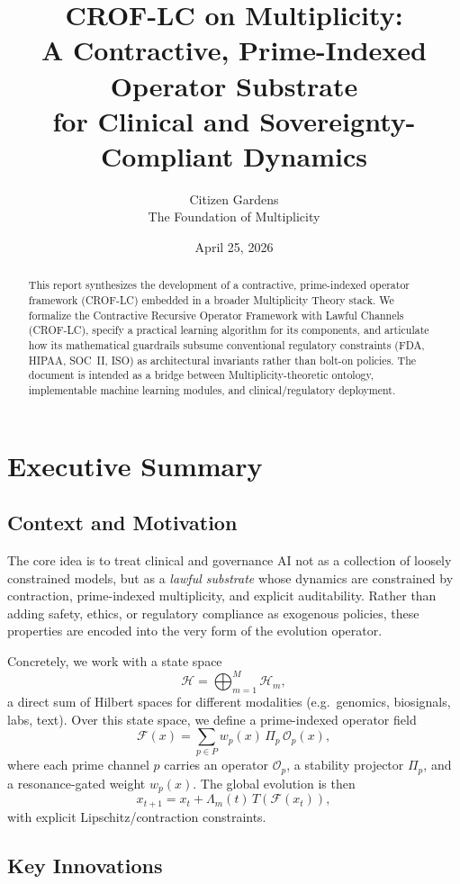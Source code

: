 \documentclass[11pt]{article}
\title{%
  CROF-LC on Multiplicity: \\
  A Contractive, Prime-Indexed Operator Substrate \\
  for Clinical and Sovereignty-Compliant Dynamics
}
\author{Citizen Gardens \\ The Foundation of Multiplicity}
\date{April 25, 2026}
\begin{document}
\maketitle

\begin{abstract}
This report synthesizes the development of a contractive, prime-indexed operator framework (CROF-LC) embedded in a broader Multiplicity Theory stack.
We formalize the Contractive Recursive Operator Framework with Lawful Channels (CROF-LC), specify a practical learning algorithm for its components, and articulate how its mathematical guardrails subsume conventional regulatory constraints (FDA, HIPAA, SOC~II, ISO) as architectural invariants rather than bolt-on policies.
The document is intended as a bridge between Multiplicity-theoretic ontology, implementable machine learning modules, and clinical/regulatory deployment.
\end{abstract}
\newpage
\tableofcontents

\section{Executive Summary}

\subsection{Context and Motivation}

The core idea is to treat clinical and governance AI not as a collection of loosely constrained models, but as a \emph{lawful substrate} whose dynamics are constrained by contraction, prime-indexed multiplicity, and explicit auditability.
Rather than adding safety, ethics, or regulatory compliance as exogenous policies, these properties are encoded into the very form of the evolution operator.

Concretely, we work with a state space
\[
  \mathcal{H} = \bigoplus_{m=1}^{M} \mathcal{H}_m,
\]
a direct sum of Hilbert spaces for different modalities (e.g.\ genomics, biosignals, labs, text).
Over this state space, we define a prime-indexed operator field
\[
  \mathcal{F}(x) = \sum_{p \in P} w_p(x)\,\Pi_p\,\mathcal{O}_p(x),
\]
where each prime channel \(p\) carries an operator \(\mathcal{O}_p\), a stability projector \(\Pi_p\), and a resonance-gated weight \(w_p(x)\).
The global evolution is then
\[
  x_{t+1} = x_t + \Lambda_m(t)\,T(\mathcal{F}(x_t)),
\]
with explicit Lipschitz/contraction constraints.

\subsection{Key Innovations}
\end{document}
